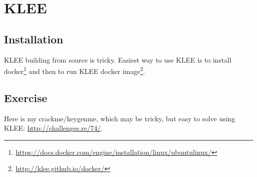 \section{KLEE}

\subsection{Installation}

KLEE building from source is tricky.
Easiest way to use KLEE is to install docker\footnote{\url{https://docs.docker.com/engine/installation/linux/ubuntulinux/}} and then to run KLEE docker image\footnote{\url{http://klee.github.io/docker/}}.














\subsection{Exercise}

Here is my crackme/keygenme, which may be tricky, but easy to solve using KLEE:
\url{http://challenges.re/74/}.


